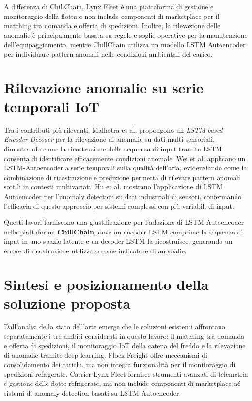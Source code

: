 A differenza di ChillChain, Lynx Fleet è una piattaforma di gestione e monitoraggio della flotta e non include componenti di marketplace per il matching tra domanda e offerta di spedizioni. Inoltre, la rilevazione delle anomalie è principalmente basata su regole e soglie operative per la manutenzione dell'equipaggiamento, mentre ChillChain utilizza un modello LSTM Autoencoder per individuare pattern anomali nelle condizioni ambientali del carico.

\section{Rilevazione anomalie su serie temporali IoT}

Tra i contributi più rilevanti, Malhotra et al. \cite{malhotra2016} propongono un \textit{LSTM-based Encoder-Decoder} per la rilevazione di anomalie su dati multi-sensoriali, dimostrando come la ricostruzione della sequenza di input tramite LSTM consenta di identificare efficacemente condizioni anomale. Wei et al. \cite{wei2022lstmiaq} applicano un LSTM-Autoencoder a serie temporali sulla qualità dell'aria, evidenziando come la combinazione di ricostruzione e predizione permetta di rilevare pattern anomali sottili in contesti multivariati. Hu et al. \cite{hu2020sensors} mostrano l'applicazione di LSTM Autoencoder per l'anomaly detection su dati industriali di sensori, confermando l'efficacia di questo approccio per sistemi complessi con più variabili di input.

Questi lavori forniscono una giustificazione per l'adozione di LSTM Autoencoder nella piattaforma \textbf{ChillChain}, dove un encoder LSTM comprime la sequenza di input in uno spazio latente e un decoder LSTM la ricostruisce, generando un errore di ricostruzione utilizzato come indicatore di anomalie. 
\section{Sintesi e posizionamento della soluzione proposta}

Dall'analisi dello stato dell'arte emerge che le soluzioni esistenti affrontano separatamente i tre ambiti considerati in questo lavoro: il matching tra domanda e offerta di spedizioni, il monitoraggio IoT della catena del freddo e la rilevazione di anomalie tramite deep learning. Flock Freight offre meccanismi di consolidamento dei carichi, ma non integra funzionalità per il monitoraggio di spedizioni refrigerate. Carrier Lynx Fleet fornisce strumenti avanzati di telemetria e gestione delle flotte refrigerate, ma non include componenti di marketplace né sistemi di anomaly detection basati su LSTM Autoencoder.

